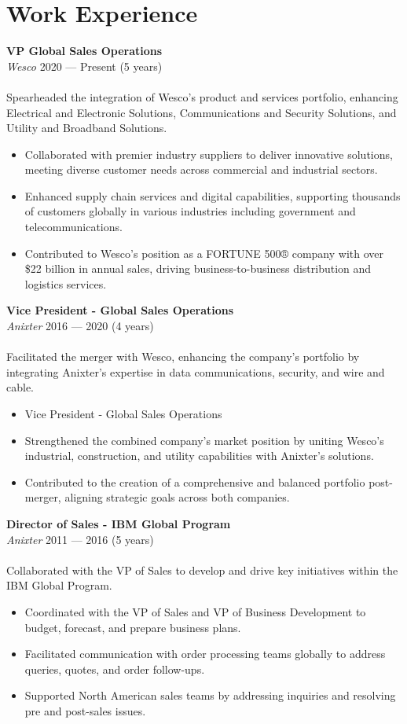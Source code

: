\documentclass[11pt,a4paper]{article}
\newcommand{\experienceentry}[4]{
  {\normalsize\bfseries #1}\\[-1pt]
  {\footnotesize\textit{#2} \hfill #3}\\
  \footnotesize 
  \\
  #4
}
\begin{document}
\hfill
\begin{minipage}[t]{0.63\textwidth}

\section*{Work Experience}
\experienceentry{VP Global Sales Operations}{Wesco}{2020 — Present (5 years)}{Spearheaded the integration of Wesco's product and services portfolio, enhancing Electrical and Electronic Solutions, Communications and Security Solutions, and Utility and Broadband Solutions.
\begin{itemize}[noitemsep, topsep=2pt, partopsep=0pt, parsep=5pt, leftmargin=10pt]
  \item Collaborated with premier industry suppliers to deliver innovative solutions, meeting diverse customer needs across commercial and industrial sectors.
  \item Enhanced supply chain services and digital capabilities, supporting thousands of customers globally in various industries including government and telecommunications.
  \item Contributed to Wesco's position as a FORTUNE 500® company with over \$22 billion in annual sales, driving business-to-business distribution and logistics services.
\end{itemize}}

\vspace{8pt}
\experienceentry{Vice President - Global Sales Operations}{Anixter}{2016 — 2020 (4 years)}{Facilitated the merger with Wesco, enhancing the company's portfolio by integrating Anixter's expertise in data communications, security, and wire and cable.
\begin{itemize}[noitemsep, topsep=2pt, partopsep=0pt, parsep=5pt, leftmargin=10pt]
  \item Vice President - Global Sales Operations
  \item Strengthened the combined company's market position by uniting Wesco's industrial, construction, and utility capabilities with Anixter's solutions.
  \item Contributed to the creation of a comprehensive and balanced portfolio post-merger, aligning strategic goals across both companies.
\end{itemize}}

\vspace{8pt}
\experienceentry{Director of Sales - IBM Global Program}{Anixter}{2011 — 2016 (5 years)}{Collaborated with the VP of Sales to develop and drive key initiatives within the IBM Global Program.
\begin{itemize}[noitemsep, topsep=2pt, partopsep=0pt, parsep=5pt, leftmargin=10pt]
  \item Coordinated with the VP of Sales and VP of Business Development to budget, forecast, and prepare business plans.
  \item Facilitated communication with order processing teams globally to address queries, quotes, and order follow-ups.
  \item Supported North American sales teams by addressing inquiries and resolving pre and post-sales issues.
\end{itemize}}


\end{minipage}
\end{document}
